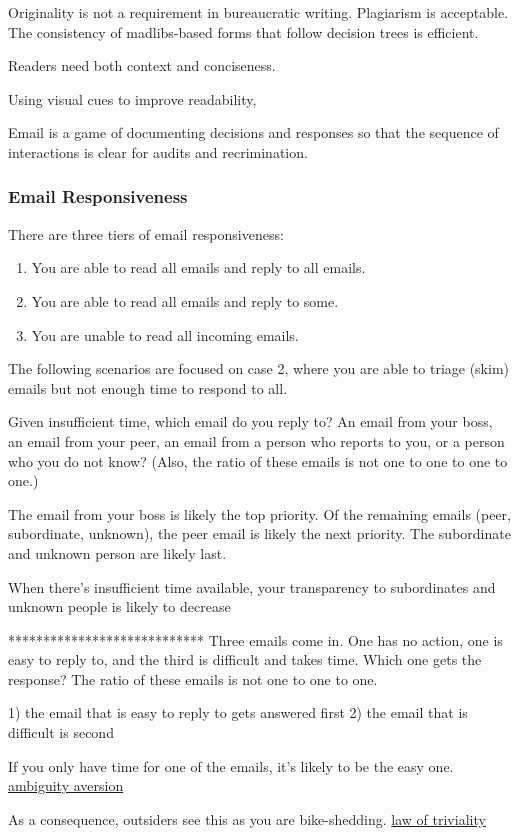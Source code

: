 Originality is not a requirement in bureaucratic writing. Plagiarism is acceptable. The consistency of madlibs-based forms that follow decision trees is efficient. 

Readers need both context and conciseness. 

Using visual cues to improve readability,

Email is a game of documenting decisions and responses so that the sequence of interactions is clear for audits and recrimination. 

\subsubsection{Email Responsiveness\label{sec:email-responsiveness}}

There are three tiers of email responsiveness:
\begin{enumerate}
    \item You are able to read all emails and reply to all emails.
    \item You are able to read all emails and reply to some.
    \item You are unable to read all incoming emails. 
\end{enumerate}
The following scenarios are focused on case 2, where you are able to triage (skim) emails but not enough time to respond to all.


Given insufficient time, which email do you reply to? An email from your boss, an email from your peer, an email from a person who reports to you, or a person who you do not know?
(Also, the ratio of these emails is not one to one to one to one.)

The email from your boss is likely the top priority. Of the remaining emails (peer, subordinate, unknown), the peer email is likely the next priority.
The subordinate and unknown person are likely last.

When there's insufficient time available, your transparency to subordinates and unknown people is likely to decrease

****************************
Three emails come in. One has no action, one is easy to reply to, and the third is difficult and takes time. Which one gets the response?
The ratio of these emails is not one to one to one.

1) the email that is easy to reply to gets answered first
2) the email that is difficult is second

If you only have time for one of the emails, it's likely to be the easy one. 
\href{https://en.wikipedia.org/wiki/Ambiguity_aversion}{ambiguity aversion}

As a consequence, outsiders see this as you are bike-shedding.
\href{https://en.wikipedia.org/wiki/Law_of_triviality}{law of triviality}

